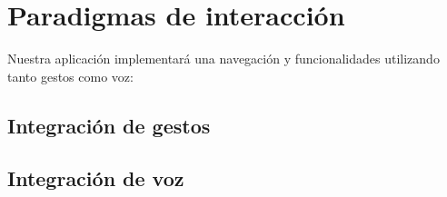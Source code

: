 \section{Paradigmas de interacción}

Nuestra aplicación implementará una navegación y funcionalidades utilizando tanto gestos como voz:

\subsection{Integración de gestos}

\subsection{Integración de voz}

